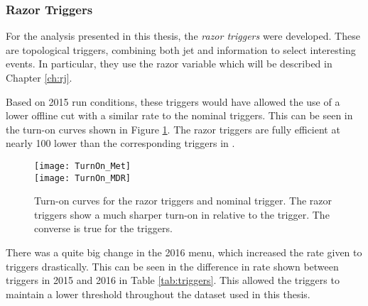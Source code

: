 \subsubsection{Razor Triggers}\label{subsubsec:razor_triggers}

For the analysis presented in this thesis, the \textit{razor triggers} were developed.
These are topological triggers, combining both jet and \met information to select interesting events.
In particular, they use the razor variable \mdr which will be described in Chapter \ref{ch:rj}.

Based on 2015 run conditions, these triggers would have allowed the use of a lower offline \met cut with a similar rate to the nominal \met triggers.
This can be seen in the turn-on curves shown in Figure \ref{fig:razor_triggers}.
The razor triggers are fully efficient at nearly 100 \GeV lower than the corresponding \met triggers in \mdr.

\begin{figure}
\caption{Turn-on curves for the razor triggers and nominal \met trigger.
The razor triggers show a much sharper turn-on in \mdr relative to the \met trigger.
The converse is true for the \met triggers.
} \label{fig:razor_triggers}
\texttt{[image: TurnOn\_Met]}\\
\texttt{[image: TurnOn\_MDR]}
\end{figure}

There was a quite big change in the 2016 menu, which increased the rate given to \met triggers drastically.
This can be seen in the difference in rate shown between \met triggers in 2015 and 2016 in Table \ref{tab:triggers}.
This allowed the \met triggers to maintain a lower threshold throughout the dataset used in this thesis.